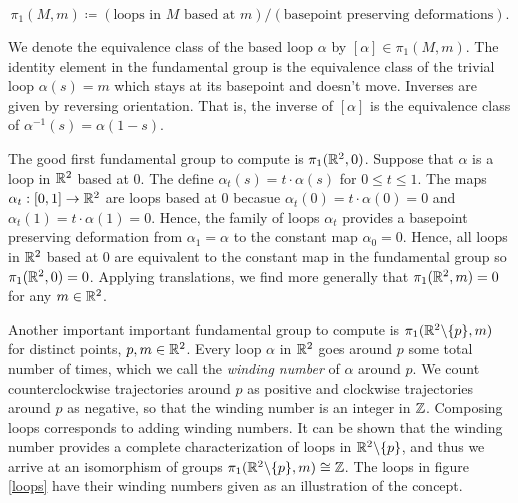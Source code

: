 $$\pi_1(M,m)\coloneqq \left(\text{loops in $M$ based at $m$}\right)/\left(\text{basepoint preserving deformations}\right).$$

We denote the equivalence class of the based loop $\alpha$ by $[\alpha]\in \pi_1(M,m)$. The identity element in the fundamental group is the equivalence class of the trivial loop $\alpha(s)=m$ which stays at its basepoint and doesn't move. Inverses are given by reversing orientation. That is, the inverse of $[\alpha]$ is the equivalence class of $\alpha^{-1}(s)=\alpha(1-s)$.

\begin{ex}
The good first fundamental group to compute is $\pi_1({\mathbb R}^2,0)$. Suppose that $\alpha$ is a loop in ${\mathbb R}^2$ based at $0$. The define $\alpha_t(s)=t\cdot \alpha(s)$ for $0\leq t\leq 1$. The maps $\alpha_t:[0,1]\to {\mathbb R}^2$ are loops based at $0$ becasue $\alpha_t(0)=t\cdot \alpha(0)=0$ and $\alpha_t(1)=t\cdot \alpha(1)=0$. Hence, the family of loops $\alpha_t$ provides a basepoint preserving deformation from $\alpha_1=\alpha$ to the constant map $\alpha_0=0$. Hence, all loops in ${\mathbb R}^2$ based at $0$ are equivalent to the constant map in the fundamental group so $\pi_1({\mathbb R}^2,0)=0$. Applying translations, we find more generally that $\pi_1({\mathbb R}^2,m)=0$ for any $m\in {\mathbb R}^2$.
\end{ex}

\begin{ex}
Another important important fundamental group to compute is $\pi_1({\mathbb R}^2\backslash\{p\},m)$ for distinct points, $p,m\in {\mathbb R}^2$. Every loop $\alpha$ in ${\mathbb R}^2$ goes around $p$ some total number of times, which we call the \textit{winding number} of $\alpha$ around $p$. We count counterclockwise trajectories around $p$ as positive and clockwise trajectories around $p$ as negative, so that the winding number is an integer in ${\mathbb Z}$. Composing loops corresponds to adding winding numbers. It can be shown that the winding number provides a complete characterization of loops in ${\mathbb R}^2\backslash \{p\}$, and thus we arrive at an isomorphism of groups $\pi_1({\mathbb R}^2\backslash\{p\},m)\cong {\mathbb Z}$. The loops in figure \ref{loops} have their winding numbers given as an illustration of the concept.
\end{ex}

